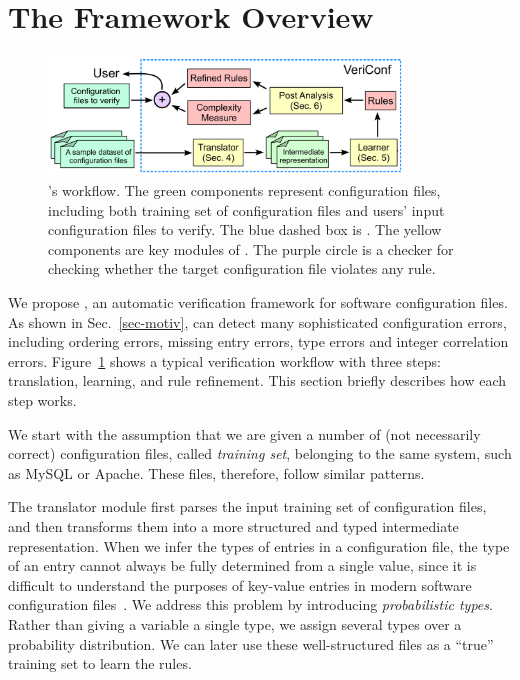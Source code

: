 
\section{The \app Framework Overview}

\begin{figure}[tbp] \centering
\includegraphics[width=0.84\textwidth]{figs/overview}
\caption{\app's workflow. The green components represent configuration 
  files, including both training set of configuration files and users' input
  configuration files to verify.
  The blue dashed box is \app. 
  The yellow components are key modules of \app.
  The purple circle is a checker for checking whether the target
  configuration file violates any rule.}
\label{fig-overview}
\end{figure}

We propose \app, an automatic verification framework for 
software configuration files.
As shown in Sec.~\ref{sec-motiv}, \app can detect many sophisticated 
configuration errors, including ordering errors, missing entry errors,
type errors and integer correlation errors. 
Figure~\ref{fig-overview} shows
a typical \app verification workflow with three steps:
translation, learning, and rule refinement. This section briefly
describes how each step works.

We start with the assumption 
that we are given a number of (not necessarily correct) 
configuration files, called {\em training set}, 
belonging to the same system, such as MySQL or Apache. 
These files, therefore, follow similar patterns.

The translator module first parses the input training  
set of configuration files, and then transforms them into 
a more structured and typed intermediate representation.
When we infer the types of entries in a configuration file, 
the type of an entry cannot always be fully determined from 
a single value, since it is difficult to understand
the purposes of key-value entries in modern
software configuration files~\cite{xu15hey}.
We address this problem 
by introducing {\em probabilistic types}.
Rather than giving a variable a single type, 
we assign several types over a probability distribution. 
We can later use these well-structured files
as a ``true'' training set to learn the rules. 

